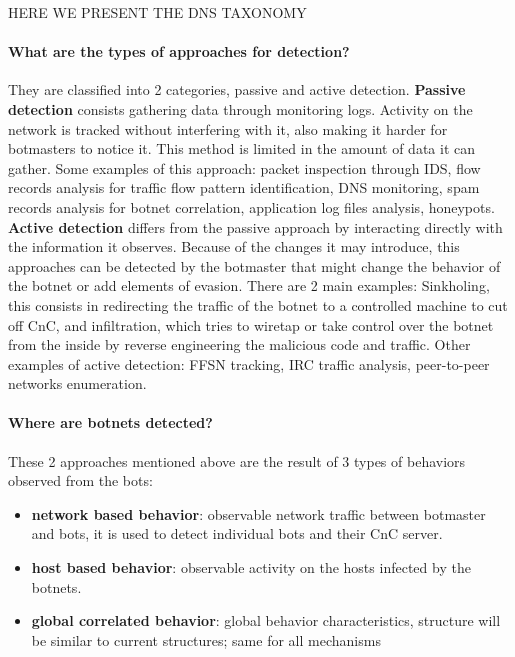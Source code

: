 HERE WE PRESENT THE DNS TAXONOMY

\paragraph{What are the types of approaches for detection?}
They are classified into 2 categories, passive and active detection\cite{detection9}. \textbf{Passive detection} consists gathering data through monitoring logs. Activity on the network is tracked without interfering with it, also making it harder for botmasters to notice it. This method is limited in the amount of data it can gather. Some examples of this approach: packet inspection through IDS, flow records analysis for traffic flow pattern identification, DNS monitoring, spam records analysis for botnet correlation, application log files analysis, honeypots. \textbf{Active detection} differs from the passive approach by interacting directly with the information it observes. Because of the changes it may introduce, this approaches can be detected by the botmaster that might change the behavior of the botnet or add elements of evasion. There are 2 main examples: Sinkholing, this consists in redirecting the traffic of the botnet to a controlled machine to cut off CnC, and infiltration, which tries to wiretap or take control over the botnet from the inside by reverse engineering the malicious code and traffic. Other examples of active detection: FFSN tracking, IRC traffic analysis, peer-to-peer networks enumeration.

\paragraph{Where are botnets detected?} These 2 approaches mentioned above are the result of 3 types of behaviors observed from the bots\cite{bot-threat1}:
 
\begin{itemize}
\item \textbf{network based behavior}: observable network traffic between botmaster and bots, it is used to detect individual bots and their CnC server. 
\item \textbf{host based behavior}: observable activity on the hosts infected by the botnets. 
\item \textbf{global correlated behavior}: global behavior characteristics, structure will be similar to current structures; same for all mechanisms
\end{itemize}



